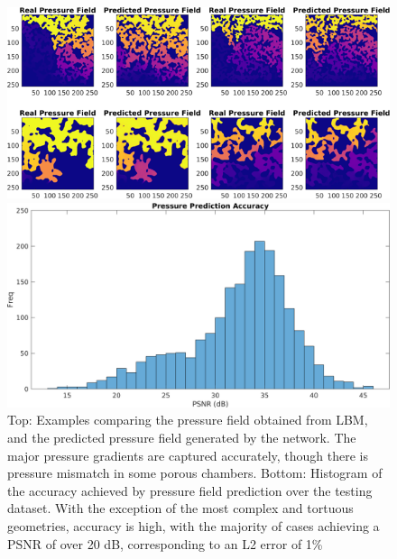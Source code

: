 \documentclass{article}
\begin{document}
\begin{figure}[htp!]
  \centering
    \includegraphics[width=\textwidth]{./figures/pressCNN.png}
     \begin{minipage}[b]{0.6\textwidth}
    \includegraphics[width=\textwidth]{./figures/pressCNNPSNRHist.png}
    \end{minipage}
    \caption{Top: Examples comparing the pressure field obtained from LBM, and the predicted pressure field generated by the network. The major pressure gradients are captured accurately, though there is pressure mismatch in some porous chambers. Bottom: Histogram of the accuracy achieved by pressure field prediction over the testing dataset. With the exception of the most complex and tortuous geometries, accuracy is high, with the majority of cases achieving a PSNR of over 20 dB, corresponding to an L2 error of 1\%}
    \label{fig:pressCNN}
\end{figure}
\end{document}
